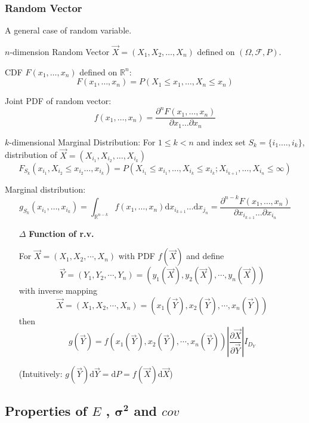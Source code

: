 \documentclass[11pt,a4paper]{ctexart}
\numberwithin{equation}{section}%
\begin{document}
\subsubsection{Random Vector}
    A general case of random variable.

    $n$-dimension Random Vector $\vec{X}=(X_1,X_2,\ldots,X_n)$ defined on $(\Omega,\mathscr{F},P)$.

    CDF $F(x_1,\ldots,x_n)$ defined on $\mathbb{R}^n$:
    \[F(x_1,\ldots,x_n)=P(X_1\leq x_1,\ldots,X_n\leq x_n)\]

    Joint PDF of random vector: 
    \[
        f(x_1,\ldots,x_n)=\dfrac{\partial^n F(x_1,\ldots,x_n)}{\partial x_1\ldots\partial x_n}
    \]

    $k$-dimensional Marginal Distribution: For $1\leq k<n$ and index set $S_k=\{i_1.\ldots,i_k\}$, distribution of $\vec{X}=(X_{i_1},X_{i_2},\ldots,X_{i_k})$
    \[F_{S_k}(x_{i_1},X_{i_2}\leq x_{i_2}\ldots,x_{i_k})=P(X_{i_1}\leq x_{i_1},\ldots,X_{i_k}\leq x_{i_k};X_{i_{k+1}},\ldots,X_{i_n}\leq\infty)\]

    Marginal distribution: 
    \[
        g_{S_k}(x_{i_1},\ldots,x_{i_k})=\int_{\mathbb{R}^{n-k}}f(x_1,\ldots,x_n)\mathrm{d}x_{i_{k+1}}\ldots\mathrm{d}x_{j_n}=\dfrac{\partial^{n-k}F(x_1,\ldots,x_n)}{\partial x_{i_{k+1}}\ldots\partial x_{i_n}}
    \]


    \begin{itemize}
        \item[$\Delta$] \textbf{Function of r.v.}
        
        For $\vec{X}=(X_1,X_2,\cdots,X_n)$ with PDF $f(\vec{X})$ and define 
        \[
            \vec{Y}=(Y_1,Y_2,\cdots,Y_n)=(y_1(\vec{X}),y_2(\vec{X}),\cdots,y_n(\vec{X}))
        \]
        with inverse mapping
        \[
            \vec{X}=(X_1,X_2,\cdots,X_n)=(x_1(\vec{Y}),x_2(\vec{Y}),\cdots,x_n(\vec{Y}))
        \]
        then
        \[
            g(\vec{Y})= f(x_1(\vec{Y}),x_2(\vec{Y}),\cdots,x_n(\vec{Y}))\left|\frac{\partial \vec{X}}{\partial\vec{Y}}\right|I_{D_Y}
        \]

        (Intuitively: $g(\vec{Y})\mathrm{d}\vec{Y}=\mathrm{d}P=f(\vec{X})\mathrm{d}\vec{X}$)
    \end{itemize}




\subsection{Properties of $E$ , $\mathbf{\sigma^2}$ and $cov$}
\end{document}

